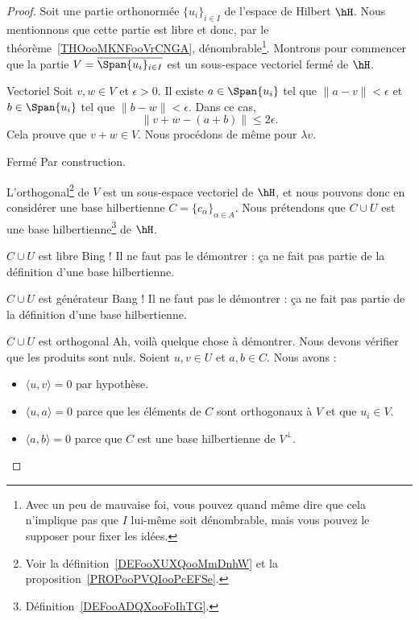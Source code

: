 \begin{proof}
	Soit une partie orthonormée \( \{ u_i \}_{i\in I}\) de l'espace de Hilbert \( \hH\). Nous mentionnons que cette partie est libre et donc, par le théorème~\ref{THOooMKNFooVrCNGA}, dénombrable\footnote{Avec un peu de mauvaise foi, vous pouvez quand même dire que cela n'implique pas que \( I\) lui-même soit dénombrable, mais vous pouvez le supposer pour fixer les idées.}.  Montrons pour commencer que la partie \( V=\overline{\Span\{ u_i \}_{i\in I}}\) est un sous-espace vectoriel fermé de \( \hH\).
	\begin{subproof}
		\item[Vectoriel] Soit \( v,w\in V\) et \( \epsilon>0\). Il existe \( a\in \Span\{ u_i \}\) tel que \( \| a-v \|<\epsilon\) et \( b\in \Span\{ u_i \}\) tel que \( \| b-w \|<\epsilon\). Dans ce cas,
		\begin{equation}
			\| v+w-(a+b) \|\leq 2\epsilon.
		\end{equation}
		Cela prouve que \( v+w\in V\). Nous procédons de même pour \( \lambda v\).
		\item[Fermé] Par construction.
	\end{subproof}

	L'orthogonal\footnote{Voir la définition~\ref{DEFooXUXQooMmDnhW} et la proposition~\ref{PROPooPVQIooPcEFSe}.} de \( V\) est un sous-espace vectoriel de \( \hH\), et nous pouvons donc en considérer une base hilbertienne \( C=\{ c_{\alpha} \}_{\alpha\in A}\). Nous prétendons que \( C\cup U\) est une base hilbertienne\footnote{Définition~\ref{DEFooADQXooFoIhTG}.} de \( \hH\).
	\begin{subproof}
		\item[\( C\cup U\) est libre]
		Bing ! Il ne faut pas le démontrer : ça ne fait pas partie de la définition d'une base hilbertienne.
		\item[\( C\cup U\) est générateur]
		Bang ! Il ne faut pas le démontrer : ça ne fait pas partie de la définition d'une base hilbertienne.
		\item[\( C\cup U\) est orthogonal]
		Ah, voilà quelque chose à démontrer. Nous devons vérifier que les produits sont nuls. Soient \( u,v\in U\) et \( a,b\in C\). Nous avons :
		\begin{itemize}
			\item \( \langle u, v\rangle =0\) par hypothèse.
			\item \( \langle u, a\rangle =0\) parce que les éléments de \( C\) sont orthogonaux à \( V\) et que \( u_i\in V\).
			\item \( \langle a, b\rangle =0\) parce que \( C\) est une base hilbertienne de \( V^{\perp}\).
		\end{itemize}


\end{subproof}
\end{proof}
